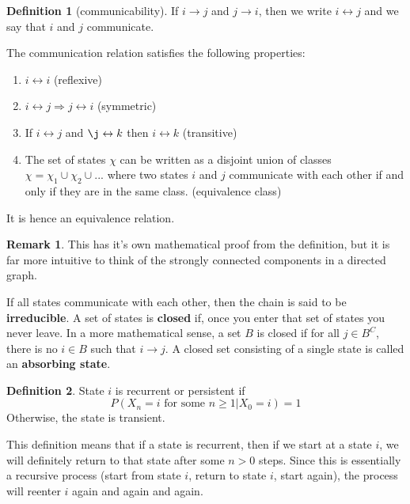 \documentclass[12pt,letterpaper]{amsbook}
\theoremstyle{definition}
\newtheorem{definition}{Definition}%
\newtheorem*{remark}{Remark}
\begin{document}
\begin{definition}  [communicability]
  If $i \rightarrow j$ and $j \rightarrow i$, then we write $i \leftrightarrow j$ and we say that $i$ and $j$ communicate.
\end{definition}

\begin{theorem}
  The communication relation satisfies the following properties:
  \begin{enumerate}
    \item $i \leftrightarrow i$ (reflexive)
    \item $i \leftrightarrow j \Rightarrow j \leftrightarrow i$ (symmetric)
    \item If $i \leftrightarrow j$ and $\j \leftrightarrow k$ then $i \leftrightarrow k$ (transitive)
    \item The set of states $\chi$ can be written as a disjoint union of classes $\chi = \chi_1 \cup \chi_2 \cup ...$ where two states $i$ and $j$ communicate with each other if and only if they are in the same class. (equivalence class)
  \end{enumerate}
  It is hence an equivalence relation.
\end{theorem}

\begin{remark}
  This has it's own mathematical proof from the definition, but it is far more intuitive to think of the strongly connected components in a directed graph.  
\end{remark}

If all states communicate with each other, then the chain is said to be \textbf{irreducible}. A set of states is \textbf{closed} if, once you enter that set of states you never leave. In a more mathematical sense, a set $B$ is closed if for all $j \in B^C$, there is no $i \in B$ such that $i \rightarrow j$. A closed set consisting of a single state is called an \textbf{absorbing state}.   

\begin{definition}
  State $i$ is recurrent or persistent if 
  \[P(X_n=i \text{ for some } n \geq 1 | X_0 = i)  = 1\]
  Otherwise, the state is transient.
\end{definition}

This definition means that if a state is recurrent, then if we start at a state $i$, we will definitely return to that state after some $n > 0$ steps. Since this is essentially a recursive process (start from state $i$, return to state $i$, start again), the process will reenter $i$ again and again and again. 
\end{document}

